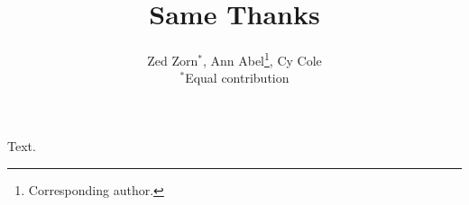 \documentclass{article}
\title{Same Thanks}
\author{Zed Zorn$^{*}$, Ann Abel\thanks{Corresponding author.}, Cy Cole\samethanks \\ $^*$Equal contribution}
\begin{document}
\maketitle
Text.
\end{document}

